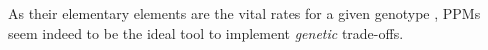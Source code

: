 \documentclass[10pt,a4paper]{article}
\begin{document}
As their elementary elements are the vital rates for a given genotype \citep{Engen2009,Csetenyi1989,Williamson1959}, PPMs seem indeed to be the ideal tool to implement \emph{genetic} trade-offs.\\ 

\end{document}
